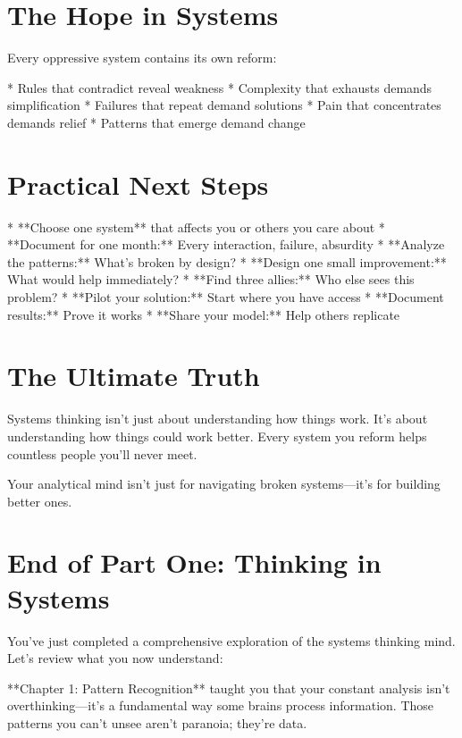 \documentclass[12pt,oneside]{book}
\begin{document}
\section{The Hope in Systems}

Every oppressive system contains its own reform:

                    * Rules that contradict reveal weakness
                    * Complexity that exhausts demands simplification
                    * Failures that repeat demand solutions
                    * Pain that concentrates demands relief
                    * Patterns that emerge demand change

\section{Practical Next Steps}

                    * **Choose one system** that affects you or others you care about
                    * **Document for one month:** Every interaction, failure, absurdity
                    * **Analyze the patterns:** What's broken by design?
                    * **Design one small improvement:** What would help immediately?
                    * **Find three allies:** Who else sees this problem?
                    * **Pilot your solution:** Start where you have access
                    * **Document results:** Prove it works
                    * **Share your model:** Help others replicate

\section{The Ultimate Truth}

Systems thinking isn't just about understanding how things work. It's about understanding how things could work better. Every system you reform helps countless people you'll never meet.

Your analytical mind isn't just for navigating broken systems---it's for building better ones.

\section{End of Part One: Thinking in Systems}

You've just completed a comprehensive exploration of the systems thinking mind. Let's review what you now understand:

**Chapter 1: Pattern Recognition** taught you that your constant analysis isn't overthinking---it's a fundamental way some brains process information. Those patterns you can't unsee aren't paranoia; they're data.
\end{document}
